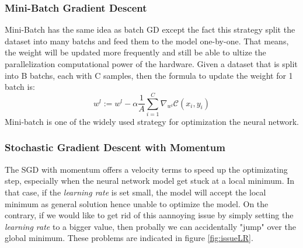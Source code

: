 \subsubsection{Mini-Batch Gradient Descent}
Mini-Batch has the same idea as batch GD except the fact this strategy split the dataset into many batchs and feed them to the model one-by-one. That means, the weight will be updated more frequently and still be able to ultize the parallelization computational power of the hardware. Given a dataset that is split into B batchs, each with C samples, then the formula to update the weight for 1 batch is:
\begin{equation}
    w^{l} := w^{l} - \alpha \frac{1}{A} \sum^{C}_{i=1} \nabla_{w^{l}} \mathcal{C}(x_{i},y_{i})
\end{equation}
Mini-batch is one of the widely used strategy for optimization the neural network.
\subsubsection{Stochastic Gradient Descent with Momentum}
The SGD with momentum offers a velocity terms to speed up the optimizating step, especially when the neural network model get stuck at a local minimum. In that case, if the \textit{learning rate} is set small, the model will accept the local minimum as general solution hence unable to optimize the model. On the contrary, if we would like to get rid of this aannoying issue by simply setting the \textit{learning rate} to a bigger value, then probally we can accidentally "jump" over the global minimum. These problems are indicated in figure \ref{fig:issueLR}.

